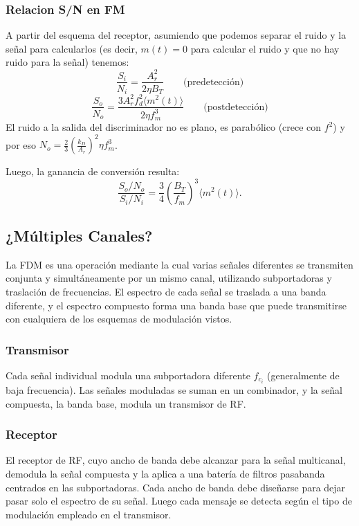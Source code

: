 \documentclass[11pt,a4paper]{article}
\numberwithin{equation}{section}
\begin{document}
\subsubsection{Relacion S/N en FM}
A partir del esquema del receptor, asumiendo que podemos separar el ruido y la señal para calcularlos (es decir, $m(t)=0$ para calcular el ruido y que no hay ruido para la señal) tenemos:
\begin{equation}
  \frac{S_i}{N_i}=\frac{A_r^2}{2\eta B_T} \qquad \text{(predetección)}
\end{equation}
\begin{equation}
  \frac{S_o}{N_o}=\frac{3A_r^2f_d^2\langle m^2(t)\rangle }{2\eta f_m^3} \qquad \text{(postdetección)}
\end{equation}
El ruido a la salida del discriminador no es plano, es parabólico (crece con $f^2$) y por eso $N_o=\frac{2}{3} \left( \frac{k_D}{A_r} \right)^2\eta f_m^3$.

Luego, la ganancia de conversión resulta:
\begin{equation}
  \frac{S_o/N_o}{S_i/N_i}=\frac{3}{4} \left( \frac{B_T}{f_m} \right)^3 \langle m^2(t)\rangle .
\end{equation}

\subsection{¿Múltiples Canales?}
La FDM es una operaci\'on mediante la cual varias se\~nales diferentes se transmiten conjunta y simult\'aneamente por un mismo canal, utilizando subportadoras y traslaci\'on de frecuencias. El espectro de cada se\~nal se traslada a una banda diferente, y el espectro compuesto forma una banda base que puede transmitirse con cualquiera de los esquemas de modulaci\'on vistos.

\subsubsection{Transmisor}
Cada se\~nal individual modula una subportadora diferente $f_{c_i}$ (generalmente de baja frecuencia). Las se\~nales moduladas se suman en un combinador, y la se\~nal compuesta, la banda base, modula un transmisor de RF.

\subsubsection{Receptor}
El receptor de RF, cuyo ancho de banda debe alcanzar para la se\~nal multicanal, demodula la se\~nal compuesta y la aplica a una bater\'ia de filtros pasabanda centrados en las subportadoras. Cada ancho de banda debe dise\~narse para dejar pasar solo el espectro de su se\~nal. Luego cada mensaje se detecta seg\'un el tipo de modulaci\'on empleado en el transmisor.
\end{document}
